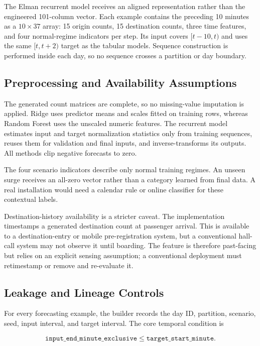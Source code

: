 \documentclass[12pt]{article}
\begin{document}
The Elman recurrent model receives an aligned representation rather than the
engineered 101-column vector. Each example contains the preceding 10 minutes
as a $10\times37$ array: 15 origin counts, 15 destination counts, three time
features, and four normal-regime indicators per step. Its input covers
$[t-10,t)$ and uses the same $[t,t+2)$ target as the tabular models. Sequence
construction is performed inside each day, so no sequence crosses a partition
or day boundary.

\subsection{Preprocessing and Availability Assumptions}

The generated count matrices are complete, so no missing-value imputation is
applied. Ridge uses predictor means and scales fitted on training rows, whereas
Random Forest uses the unscaled numeric features. The recurrent model estimates
input and target normalization statistics only from training sequences, reuses
them for validation and final inputs, and inverse-transforms its outputs. All
methods clip negative forecasts to zero.

The four scenario indicators describe only normal training regimes. An unseen
surge receives an all-zero vector rather than a category learned from final
data. A real installation would need a calendar rule or online classifier for
these contextual labels.

Destination-history availability is a stricter caveat. The implementation
timestamps a generated destination count at passenger arrival. This is
available to a destination-entry or mobile pre-registration system, but a
conventional hall-call system may not observe it until boarding. The feature
is therefore past-facing but relies on an explicit sensing assumption; a
conventional deployment must retimestamp or remove and re-evaluate it.

\subsection{Leakage and Lineage Controls}

For every forecasting example, the builder records the day ID, partition,
scenario, seed, input interval, and target interval. The core temporal
condition is

\begin{equation}
  \texttt{input\_end\_minute\_exclusive}
  \leq
  \texttt{target\_start\_minute}.
  \label{eq:leakage-boundary}
\end{equation}
\end{document}
